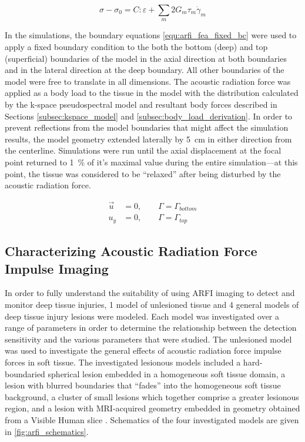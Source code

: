 			\begin{equation}
				\label{fea:time_deformation_visco}
				\sigma - \sigma_0 = C : \varepsilon + \sum_m 2 G_m \tau_m \dot{\gamma}_m 
			\end{equation}

			In the simulations, the boundary equations \ref{equ:arfi_fea_fixed_bc} were used to apply a fixed boundary condition to the both the bottom (deep) and top (superficial) boundaries of the model in the axial direction at both boundaries and in the lateral direction at the deep boundary. All other boundaries of the model were free to translate in all dimensions. The acoustic radiation force was applied as a body load to the tissue in the model with the distribution calculated by the k-space pseudospectral model and resultant body forces described in Sections \ref{subsec:kspace_model} and \ref{subsec:body_load_derivation}. In order to prevent reflections from the model boundaries that might affect the simulation results, the model geometry extended laterally by \SI{5}{\cm} in either direction from the centerline. Simulations were run until the axial displacement at the focal point returned to \SI{1}{\percent} of it's maximal value during the entire simulation---at this point, the tissue was considered to be ``relaxed'' after being disturbed by the acoustic radiation force.

			\begin{subequations}
				\label{equ:arfi_fea_fixed_bc}
				\begin{align}
					\vec{u} &= 0, \qquad \Gamma = \Gamma_{bottom} \\
					u_y &= 0, \qquad \Gamma = \Gamma_{top}
				\end{align}
			\end{subequations}

		\FloatBarrier
		\subsection{Characterizing Acoustic Radiation Force Impulse Imaging}
		\label{subsec:arfi_method_characterization}
			In order to fully understand the suitability of using ARFI imaging to detect and monitor deep tissue injuries, 1 model of unlesioned tissue and 4 general models of deep tissue injury lesions were modeled. Each model was investigated over a range of parameters in order to determine the relationship between the detection sensitivity and the various parameters that were studied. The unlesioned model was used to investigate the general effects of acoustic radiation force impulse forces in soft tissue. The investigated lesionous models included a hard-boundaried spherical lesion embedded in a homogeneous soft tissue domain, a lesion with blurred boundaries that ``fades'' into the homogeneous soft tissue background, a cluster of small lesions which together comprise a greater lesionous region, and a lesion with MRI-acquired geometry \cite{solis13} embedded in geometry obtained from a Visible Human slice \cite{visiblehuman}. Schematics of the four investigated models are given in \ref{fig:arfi_schematics}.

